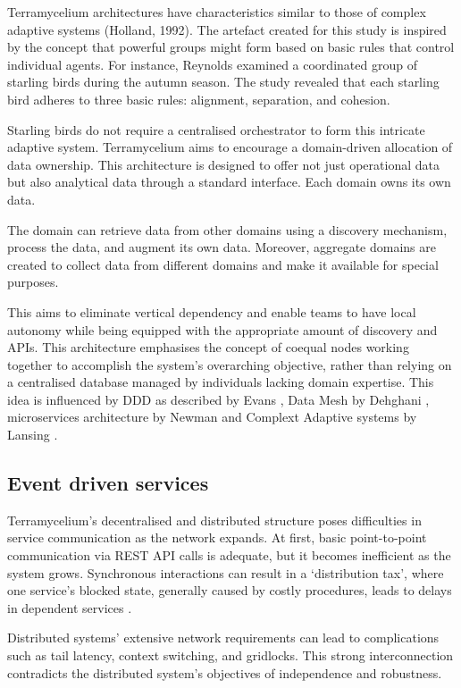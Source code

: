 \documentclass[preprint,12pt]{elsarticle}
\begin{document}
Terramycelium architectures have characteristics similar to those of complex adaptive systems (Holland, 1992). The artefact created for this study is inspired by the concept that powerful groups might form based on basic rules that control individual agents. For instance, Reynolds \cite{reynolds1987flocks} examined a coordinated group of starling birds during the autumn season. The study revealed that each starling bird adheres to three basic rules: alignment, separation, and cohesion.

Starling birds do not require a centralised orchestrator to form this intricate adaptive system. Terramycelium aims to encourage a domain-driven allocation of data ownership. This architecture is designed to offer not just operational data but also analytical data through a standard interface. Each domain owns its own data.

The domain can retrieve data from other domains using a discovery mechanism, process the data, and augment its own data. Moreover, aggregate domains are created to collect data from different domains and make it available for special purposes. 

This aims to eliminate vertical dependency and enable teams to have local autonomy while being equipped with the appropriate amount of discovery and APIs. This architecture emphasises the concept of coequal nodes working together to accomplish the system's overarching objective, rather than relying on a centralised database managed by individuals lacking domain expertise. This idea is influenced by DDD as described by Evans \cite{evans2004domain}, Data Mesh by Dehghani \cite{DataMesh}, microservices architecture by Newman \cite{newman2021building} and Complext Adaptive systems by Lansing \cite{lansing2003complex}. 

\subsection{Event driven services}

Terramycelium's decentralised and distributed structure poses difficulties in service communication as the network expands. At first, basic point-to-point communication via REST API calls is adequate, but it becomes inefficient as the system grows. Synchronous interactions can result in a `distribution tax', where one service's blocked state, generally caused by costly procedures, leads to delays in dependent services \cite{montesi2016circuit}.

Distributed systems' extensive network requirements can lead to complications such as tail latency, context switching, and gridlocks. This strong interconnection contradicts the distributed system's objectives of independence and robustness.
\end{document}
